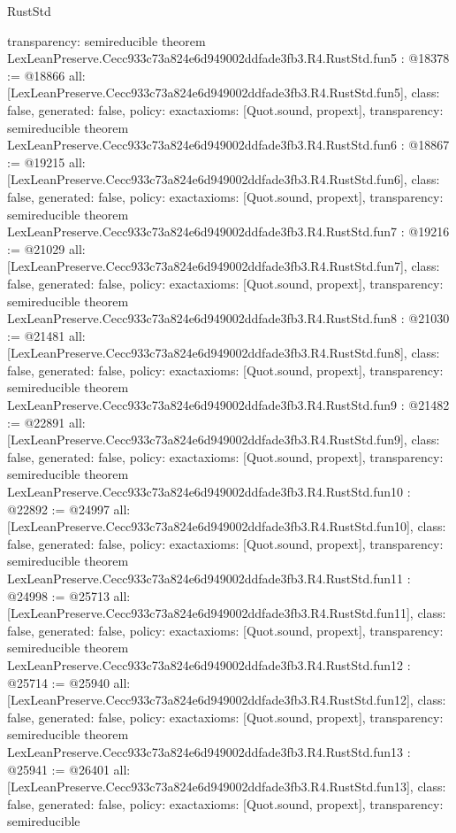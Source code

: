 \begin{lexlean}{RustStd}
\begin{coremodule}
{  transparency: semireducible
}
theorem LexLeanPreserve.Cecc933c73a824e6d949002ddfade3fb3.R4.RustStd.fun5 : @18378 := @18866 {
  all: [LexLeanPreserve.Cecc933c73a824e6d949002ddfade3fb3.R4.RustStd.fun5],
  class: false,
  generated: false,
  policy: exact{axioms: [Quot.sound, propext]},
  transparency: semireducible
}
theorem LexLeanPreserve.Cecc933c73a824e6d949002ddfade3fb3.R4.RustStd.fun6 : @18867 := @19215 {
  all: [LexLeanPreserve.Cecc933c73a824e6d949002ddfade3fb3.R4.RustStd.fun6],
  class: false,
  generated: false,
  policy: exact{axioms: [Quot.sound, propext]},
  transparency: semireducible
}
theorem LexLeanPreserve.Cecc933c73a824e6d949002ddfade3fb3.R4.RustStd.fun7 : @19216 := @21029 {
  all: [LexLeanPreserve.Cecc933c73a824e6d949002ddfade3fb3.R4.RustStd.fun7],
  class: false,
  generated: false,
  policy: exact{axioms: [Quot.sound, propext]},
  transparency: semireducible
}
theorem LexLeanPreserve.Cecc933c73a824e6d949002ddfade3fb3.R4.RustStd.fun8 : @21030 := @21481 {
  all: [LexLeanPreserve.Cecc933c73a824e6d949002ddfade3fb3.R4.RustStd.fun8],
  class: false,
  generated: false,
  policy: exact{axioms: [Quot.sound, propext]},
  transparency: semireducible
}
theorem LexLeanPreserve.Cecc933c73a824e6d949002ddfade3fb3.R4.RustStd.fun9 : @21482 := @22891 {
  all: [LexLeanPreserve.Cecc933c73a824e6d949002ddfade3fb3.R4.RustStd.fun9],
  class: false,
  generated: false,
  policy: exact{axioms: [Quot.sound, propext]},
  transparency: semireducible
}
theorem LexLeanPreserve.Cecc933c73a824e6d949002ddfade3fb3.R4.RustStd.fun10 : @22892 := @24997 {
  all: [LexLeanPreserve.Cecc933c73a824e6d949002ddfade3fb3.R4.RustStd.fun10],
  class: false,
  generated: false,
  policy: exact{axioms: [Quot.sound, propext]},
  transparency: semireducible
}
theorem LexLeanPreserve.Cecc933c73a824e6d949002ddfade3fb3.R4.RustStd.fun11 : @24998 := @25713 {
  all: [LexLeanPreserve.Cecc933c73a824e6d949002ddfade3fb3.R4.RustStd.fun11],
  class: false,
  generated: false,
  policy: exact{axioms: [Quot.sound, propext]},
  transparency: semireducible
}
theorem LexLeanPreserve.Cecc933c73a824e6d949002ddfade3fb3.R4.RustStd.fun12 : @25714 := @25940 {
  all: [LexLeanPreserve.Cecc933c73a824e6d949002ddfade3fb3.R4.RustStd.fun12],
  class: false,
  generated: false,
  policy: exact{axioms: [Quot.sound, propext]},
  transparency: semireducible
}
theorem LexLeanPreserve.Cecc933c73a824e6d949002ddfade3fb3.R4.RustStd.fun13 : @25941 := @26401 {
  all: [LexLeanPreserve.Cecc933c73a824e6d949002ddfade3fb3.R4.RustStd.fun13],
  class: false,
  generated: false,
  policy: exact{axioms: [Quot.sound, propext]},
  transparency: semireducible
}
\end{coremodule}
\end{lexlean}
